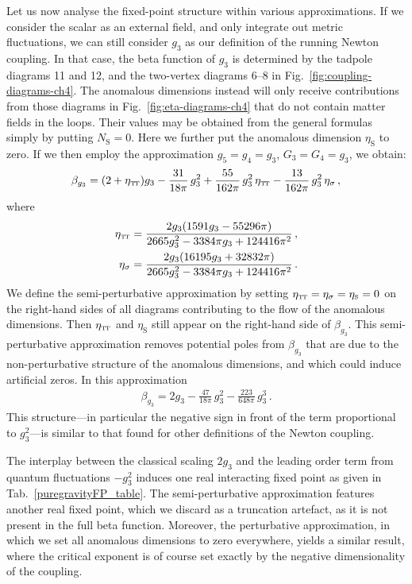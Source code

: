 \documentclass[11pt]{book}
\newcommand\TTspace{ -1pt }
\newcommand\etaTT{ \eta_{\scriptscriptstyle{\mathrm{T\hspace{\TTspace}T}}} }
\newcommand\etaS{ \eta_{\scriptscriptstyle{\mathrm{S}}} }
\newcommand\NS{ N_{\scriptscriptstyle{\mathrm{S}}} }
\numberwithin{equation}{chapter}
\begin{document}
Let us now analyse the fixed-point structure within various approximations.
If we consider the scalar as an external field, and only integrate out metric fluctuations,
we can still consider $g_3$ as our definition of the running Newton coupling.
In that case, the beta function of ${g_3}$ is determined by the tadpole diagrams 11 and 12,
and the two-vertex diagrams 6--8 in Fig.~\ref{fig:coupling-diagrams-ch4}.
The anomalous dimensions instead will only receive contributions from those diagrams
in Fig.~\ref{fig:eta-diagrams-ch4}
that do not contain matter fields in the loops.
Their values may be obtained from the general formulas simply by putting $\NS=0$.
Here we further put the anomalous dimension $\etaS$ to zero.
If we then employ the approximation $g_5 = g_4 = g_3$, $G_3 = G_4 = g_3$, we obtain:
\begin{align}
  \beta_{g_3} = (2+\etaTT) g_3
              - \frac{31}{18 \pi} \, g_3^2
              + \frac{55}{162\pi} \, g_3^2 \, \etaTT
              - \frac{13}{162\pi} \, g_3^2 \, \eta_\sigma \,,
\end{align}
where
\begin{align}
  \etaTT      &= \frac{2g_3(1591 g_3-55296 \pi)}{2665 g_3^2-3384\pi g_3 +124416 \pi^2}  \,, \\
  \eta_\sigma &= \frac{2g_3(16195 g_3+32832 \pi)}{2665 g_3^2-3384\pi g_3 +124416 \pi^2} \,.
\end{align}
We define the semi-perturbative approximation by setting
$\etaTT = \eta_{\sigma} = \etaS = 0$ on the right-hand sides of all diagrams contributing
to the flow of the anomalous dimensions.
Then $\etaTT$ and $\etaS$ still appear on the right-hand side of $\beta_{g_3}$.
This semi-perturbative approximation removes potential poles from $\beta_{g_3}$ that are
due to the non-perturbative structure of the anomalous dimensions,
and which could induce artificial zeros.  In this approximation
\begin{align}
  \beta_{g_3} = 2g_3 - \frac{47}{18 \pi} \, g_3^2 - \frac{223}{648\pi} \, g_3^3 \,.
  \label{purgravitysemipertbeta}
\end{align}
This structure---in particular the negative sign in front of the term proportional to $g_3^2$---is
similar to that found for other definitions of the Newton coupling.

The interplay between the classical scaling $2 g_3$ and the leading order term from quantum fluctuations
$-g_3^2$ induces one real interacting fixed point as given in Tab.~\ref{puregravityFP_table}.
The semi-perturbative approximation features another real fixed point,
which we discard as a truncation artefact, as it is not present in the full beta function.
Moreover, the perturbative approximation, in which we set all anomalous dimensions to zero everywhere,
yields a similar result, where the critical exponent is of course set exactly by the negative dimensionality
of the coupling.
\end{document}
